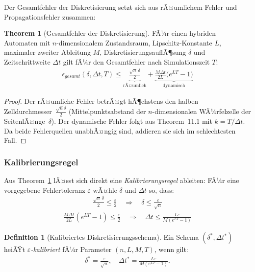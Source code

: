 ﻿\documentclass[a4paper,12pt]{article}
\theoremstyle{definition}
\newtheorem{definition}{Definition}[section]
\newtheorem{theorem}{Theorem}[section]
\begin{document}
Der Gesamtfehler der Diskretisierung setzt sich aus rÃ¤umlichem Fehler und Propagationsfehler zusammen:

\begin{theorem}[Gesamtfehler der Diskretisierung]
\label{thm:gesamtfehler}
FÃ¼r einen hybriden Automaten mit $n$-dimensionalem Zustandsraum, Lipschitz-Konstante $L$, maximaler zweiter Ableitung $M$, DiskretisierungsauflÃ¶sung $\delta$ und Zeitschrittweite $\Delta t$ gilt fÃ¼r den Gesamtfehler nach Simulationszeit $T$:
\begin{align}
  \epsilon_{\mathit{gesamt}}(\delta, \Delta t, T) \leq \underbrace{\frac{\sqrt{n}\,\delta}{2}}_{\text{rÃ¤umlich}} + \underbrace{\frac{M\Delta t}{2L}\bigl(e^{LT} - 1\bigr)}_{\text{dynamisch}}
\end{align}
\end{theorem}

\begin{proof}
Der rÃ¤umliche Fehler betrÃ¤gt hÃ¶chstens den halben Zelldurchmesser~$\frac{\sqrt{n}\delta}{2}$ (Mittelpunktsabstand der $n$-di\-men\-sio\-na\-len WÃ¼rfelzelle der SeitenlÃ¤nge~$\delta$). Der dynamische Fehler folgt aus Theorem~11.1 mit $k = T/\Delta t$. Da beide Fehlerquellen unabhÃ¤ngig sind, addieren sie sich im schlechtesten Fall.
\end{proof}

\subsubsection{Kalibrierungsregel}

Aus Theorem~\ref{thm:gesamtfehler} lÃ¤sst sich direkt eine \emph{Kalibrierungsregel} ableiten: FÃ¼r eine vorgegebene Fehlertoleranz $\varepsilon$ wÃ¤hle $\delta$ und $\Delta t$ so, dass:
\begin{align}
  \frac{\sqrt{n}\,\delta}{2} \leq \frac{\varepsilon}{2} \quad \Rightarrow \quad \delta \leq \frac{\varepsilon}{\sqrt{n}}
  \label{eq:kalibrierung_raeumlich}
\end{align}
\begin{align}
  \frac{M\Delta t}{2L}(e^{LT}-1) \leq \frac{\varepsilon}{2} \quad \Rightarrow \quad \Delta t \leq \frac{L\varepsilon}{M(e^{LT}-1)}
  \label{eq:kalibrierung_dynamisch}
\end{align}

\begin{definition}[Kalibriertes Diskretisierungsschema]
Ein Schema $(\delta^*, \Delta t^*)$ heiÃŸt \emph{$\varepsilon$-kalibriert} fÃ¼r Parameter $(n, L, M, T)$, wenn gilt:
\begin{align}
  \delta^* = \frac{\varepsilon}{\sqrt{n}}, \quad \Delta t^* = \frac{L\varepsilon}{M(e^{LT}-1)}.
\end{align}
\end{definition}
\end{document}
